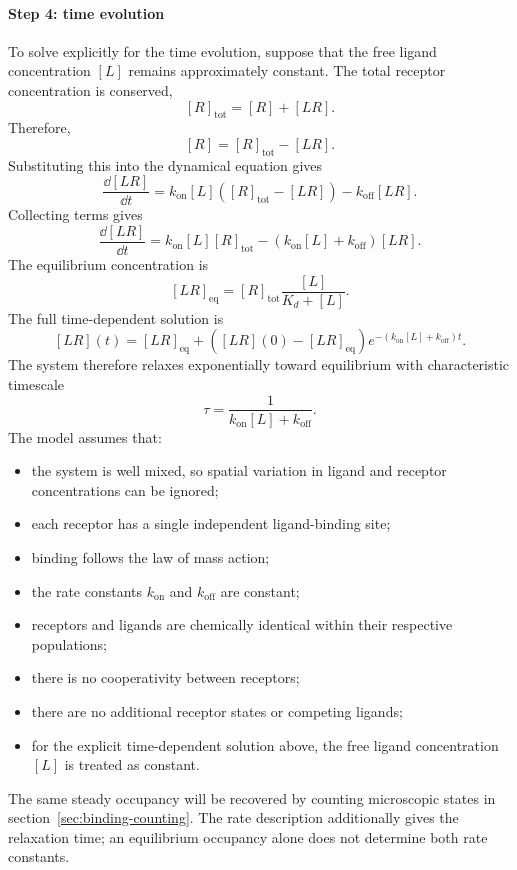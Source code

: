 \paragraph{Step 4: time evolution}
To solve explicitly for the time evolution, suppose that the free ligand concentration $[L]$ remains approximately constant.
The total receptor concentration is conserved,
\[
    [R]_{\mathrm{tot}} = [R]+[LR].
\]
Therefore,
\[
    [R] = [R]_{\mathrm{tot}}-[LR].
\]
Substituting this into the dynamical equation gives
\[
    \frac{\dd[LR]}{\dd t} = k_{\mathrm{on}}[L]\left([R]_{\mathrm{tot}}-[LR]\right)-k_{\mathrm{off}}[LR].
\]
Collecting terms gives
\[
    \frac{\dd[LR]}{\dd t} = k_{\mathrm{on}}[L][R]_{\mathrm{tot}}-\left(k_{\mathrm{on}}[L]+k_{\mathrm{off}}\right)[LR].
\]
The equilibrium concentration is
\[
    [LR]_{\mathrm{eq}} = [R]_{\mathrm{tot}}\frac{[L]}{K_d+[L]}.
\]
The full time-dependent solution is
\[
    [LR](t) = [LR]_{\mathrm{eq}} + \left([LR](0)-[LR]_{\mathrm{eq}}\right)e^{-\left(k_{\mathrm{on}}[L]+k_{\mathrm{off}}\right)t}.
\]
The system therefore relaxes exponentially toward equilibrium with characteristic timescale
\[
    \tau = \frac{1}{k_{\mathrm{on}}[L]+k_{\mathrm{off}}}.
\]
% 
% 
The model assumes that:
\begin{itemize}
    \item the system is well mixed, so spatial variation in ligand and receptor concentrations can be ignored;
    \item each receptor has a single independent ligand-binding site;
    \item binding follows the law of mass action;
    \item the rate constants $k_{\mathrm{on}}$ and $k_{\mathrm{off}}$ are constant;
    \item receptors and ligands are chemically identical within their respective populations;
    \item there is no cooperativity between receptors;
    \item there are no additional receptor states or competing ligands;
    \item for the explicit time-dependent solution above, the free ligand concentration $[L]$ is treated as constant.
\end{itemize}



The same steady occupancy will be recovered by counting microscopic states in section~\ref{sec:binding-counting}.
The rate description additionally gives the relaxation time; an equilibrium occupancy alone does not determine both rate constants.
